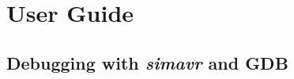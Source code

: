
\chapter{User Guide}

\section{Debugging with \emph{simavr} and \ac{GDB}} \label{section:debugging}


